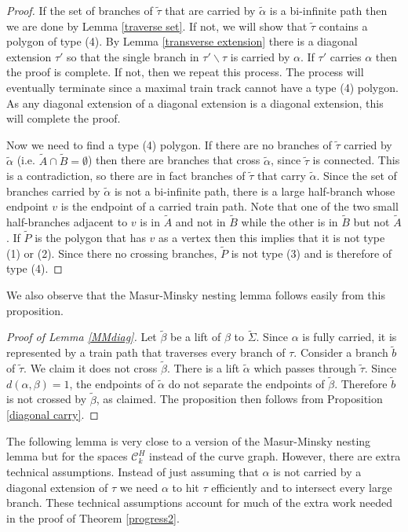 \documentclass[11pt]{article}
\theoremstyle{remark}
\def\C{{\mathcal C}}
\begin{document}
\begin{proof}
If the set of branches of $\tilde\tau$ that are carried by $\tilde\alpha$ is a bi-infinite path then we are done by Lemma \ref{traverse set}. If not, we will show that $\tilde\tau$ contains a polygon of type (4). By Lemma \ref{transverse extension} there is a diagonal extension $\tau'$ so that the single branch in $\tau' \smallsetminus \tau$ is carried by $\alpha$. If $\tau'$ carries $\alpha$ then the proof is complete. If not, then we repeat this process. The process will eventually terminate since a maximal train track cannot have a type (4) polygon. As any diagonal extension of a diagonal extension is a diagonal extension, this will complete the proof.

Now we need to find a type (4) polygon. If there are no branches of $\tilde \tau$ carried by $\tilde \alpha$ (i.e. $\tilde{A} \cap \tilde{B} = \emptyset$) then there are branches that cross $\tilde\alpha$, since $\tilde\tau$ is connected. This is a contradiction, so there
are in fact branches of $\tilde \tau$ that carry $\tilde \alpha$.
Since  the set of branches carried by $\tilde \alpha$ is not a bi-infinite path, there is a large half-branch whose endpoint $v$ is the endpoint of a carried train path. Note that one of the two small half-branches adjacent to $v$ is in $\tilde{A}$ and not in $\tilde{B}$ while the other is in $\tilde{B}$ but not $\tilde{A}$.  If $\tilde P$ is the polygon that has $v$ as a vertex then this implies that it is not type (1) or (2). Since there no crossing branches, $\tilde P$ is not type (3) and is therefore of type (4).
\end{proof}

We also observe that the Masur-Minsky nesting lemma follows easily from this proposition.
\begin{proof}[Proof of Lemma \ref{MMdiag}]
Let $\tilde \beta$ be a lift of $\beta$ to $\tilde\Sigma$. Since $\alpha$ is fully carried, it is represented by a train path that traverses every branch of $\tau$.
Consider a branch $\tilde b$ of $\tilde \tau$. We claim it does not cross $\tilde \beta$.
There is a lift $\tilde\alpha$ which passes through $\tilde\tau$.
Since $d(\alpha, \beta) = 1$, the endpoints of $\tilde\alpha$ do not separate the endpoints of $\tilde\beta$. Therefore $\tilde b$ is not crossed by $\tilde\beta$, as claimed.
The proposition then follows from Proposition \ref{diagonal carry}.
\end{proof}

The following lemma is very close to a version of the Masur-Minsky nesting lemma but for the spaces $\C^H_k$ instead of the curve graph. However, there are extra technical assumptions. Instead of just assuming that $\alpha$ is not carried by a diagonal extension of $\tau$ we need $\alpha$ to hit $\tau$ efficiently and to intersect every large branch. These technical assumptions account for much of the extra work needed in the proof of Theorem \ref{progress2}.
\end{document}

